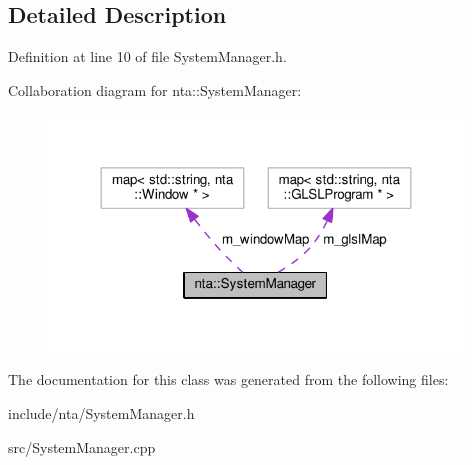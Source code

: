\subsection{Detailed Description}


Definition at line 10 of file System\+Manager.\+h.



Collaboration diagram for nta\+:\+:System\+Manager\+:\nopagebreak
\begin{figure}[H]
\begin{center}
\leavevmode
\includegraphics[width=312pt]{d5/d24/classnta_1_1SystemManager__coll__graph}
\end{center}
\end{figure}


The documentation for this class was generated from the following files\+:\begin{DoxyCompactItemize}
\item 
include/nta/System\+Manager.\+h\item 
src/System\+Manager.\+cpp\end{DoxyCompactItemize}
